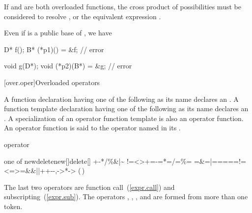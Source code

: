 \pnum
\begin{note}
If
and
are both overloaded functions, the
cross product of possibilities must be considered
to resolve
,
or the equivalent expression
.
\end{note}

\pnum
{}%
\begin{note}
Even if  is a public base of ,
we have

\begin{codeblock}
D* f();
B* (*p1)() = &f;                // error

void g(D*);
void (*p2)(B*) = &g;            // error
\end{codeblock}
\end{note}

[over.oper]{Overloaded operators}%
%
%

\pnum
{}%
%
A function declaration having one of the following
as its name declares an
.
A function template declaration having one of the
following  as its name
declares an . A specialization
of an operator function template is also an operator function.
An operator function is said to
the operator named in its
.

\begin{bnf}
\br
     operator
\end{bnf}

\begin{bnfkeywordtab}
 \textnormal{one of}\br
\>new\>delete\>new[]\>delete[]\br
\>+\>-\>*\>/\>\%\>\caret\>\&\>|\>\~\br
\>!\>=\><\>>\>+=\>-=\>*=\>/=\>\%=\br
\>\caret=\>\&=\>|=\>\shl\>\shr\>\shr=\>\shl=\>={=}\>!=\br
\><=\>>=\>\&\&\>|{|}\>++\>-{-}\>,\>->*\>->\br
\>(\,)\>[\,]
\end{bnfkeywordtab}

\begin{note}
The last two operators are function call~(\ref{expr.call})
and subscripting~(\ref{expr.sub}).
The operators
,
,
\tcode{()},
and
\tcode{[]}
are formed from more than one token.
\end{note}
%
%

